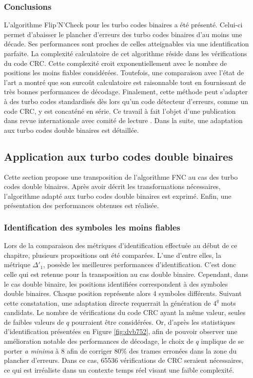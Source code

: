 \subsubsection{Conclusions}
L'algorithme Flip'N'Check pour les turbo codes binaires a été présenté. Celui-ci permet d'abaisser le plancher d'erreurs 
des turbo codes binaires d'au moins une décade. Ses performances sont proches de celles atteignables via une 
identification parfaite. La complexité calculatoire de cet algorithme réside dans les vérifications du code CRC. Cette 
complexité croit exponentiellement avec le nombre de positions les moins fiables considérées. Toutefois, une 
comparaison avec l'état de l'art a montré que son surcoût calculatoire est raisonnable tout en fournissant de très bonnes 
performances de décodage. Finalement, cette méthode peut s'adapter à des turbo codes standardisés dès lors qu'un code 
détecteur d'erreurs, comme un code CRC, y est concaténé en série. Ce travail à fait l'objet d'une publication dans revue
internationale avec comité de lecture . Dans la suite, une adaptation aux turbo codes double binaires est détaillée.


\subsection{Application aux turbo codes double binaires}
Cette section propose une transposition de l'algorithme FNC au cas des turbo codes double binaires. Après avoir décrit 
les transformations nécessaires, l'algorithme adapté aux turbo codes double binaires est exprimé. Enfin, une présentation 
des performances obtenues est réalisée.
\subsubsection{Identification des symboles les moins fiables}
Lors de la comparaison des métriques d'identification effectuée au début de ce chapitre, plusieurs propositions ont été 
comparées. L'une d'entre elles, la métrique $\Delta'_1$, possède les meilleures performances d'identification. C'est donc
celle qui est retenue pour la transposition au cas double binaire. Cependant, dans le cas double binaire, les positions identifiées correspondent 
à des symboles double binaires. Chaque position représente alors 4 symboles différents. Suivant cette constatation, une adaptation directe 
requerrait la génération de $4^q$ mots candidats. Le nombre de vérifications du code CRC ayant la même valeur, 
seules de faibles valeurs de $q$ pourraient être considérées. Or, d'après les statistiques d'identification présentées en Figure 
\ref{fig:dvb752}, afin de pouvoir observer une amélioration notable des performances de décodage, le choix de $q$ implique 
de se porter \textit{a minima} à 8 afin de corriger $80\%$ des trames erronées dans la zone du plancher d'erreurs. Dans 
ce cas, 65536 vérifications de CRC seraient nécessaires, ce qui est 
irréaliste dans un contexte temps réel visant une faible complexité.


